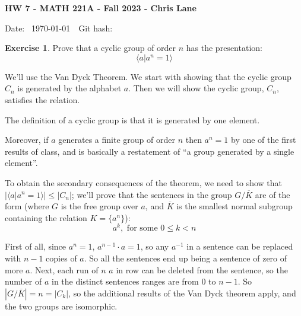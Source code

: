 \documentclass[11pt,oneside]{article}
\numberwithin{equation}{section}
\theoremstyle{definition}
\newtheorem{exercise}{Exercise}
\begin{document}
\textbf{HW 7 - MATH 221A - Fall 2023 - Chris Lane}

Date: \hhmmsstime{} \ \today \ \ Git hash: 


\begin{exercise}
  Prove that a cyclic group of order $n$ has the presentation:
  \[
  \langle a | a^n = 1 \rangle
  \]
\end{exercise}
\begin{solution}

  We'll use the Van Dyck Theorem.  We start with showing that the
  cyclic group $C_n$ is generated by the alphabet $a$.  Then we will
  show the cyclic group, $C_n$, satisfies the relation.

  The definition of a cyclic group is that it is generated by one element.  
  
  Moreover, if $a$ generates a finite group of order $n$ then $ a ^ n = 1$
  by one of the first results of class, and is basically a restatement of
  ``a group generated by a single element''.

  To obtain the secondary consequences of the theorem, we need to show
  that $ | \langle a | a^n = 1 \rangle | \leq |C_n|$; we'll prove that
  the sentences in the group $G / \overline K $ are of the form (where
  $G$ is the free group over ${a}$, and $\overline K$ is the smallest
  normal subgroup containing the relation $K = \{ a^n\}$):
  \[
  a ^ k, \textrm{ for some } 0 \leq k < n
  \]

  First of all, since $a ^ n = 1$, $a ^ {n-1} \cdot a = 1$, so any $a^{-1}$ in a sentence
  can be replaced with $n-1 $ copies of $a$.  So all the sentences end up being
  a sentence of zero of more $a$.  Next, each run of $n$ $a$ in row can be
  deleted from the sentence, so the number of $a$ in the distinct sentences ranges are
  from $0$ to $n-1$.  So $|G / \overline K| = n = |C_k|$, so the
  additional results of the Van Dyck theorem apply, and the two groups are isomorphic.  
\end{solution}
\end{document}
